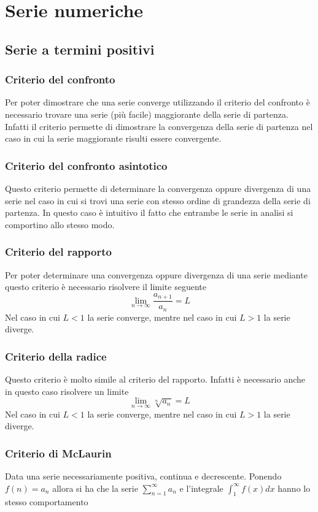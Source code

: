 \documentclass[10pt,a4paper]{report}
\begin{document}
\section*{Serie numeriche}
\subsection*{Serie a termini positivi}

\subsubsection{Criterio del confronto}
 Per poter dimostrare che una serie converge utilizzando il criterio del confronto è necessario trovare una serie (più facile) maggiorante della serie di partenza. Infatti il criterio permette di dimostrare la convergenza della serie di partenza nel caso in cui la serie maggiorante risulti essere convergente.
\subsubsection{Criterio del confronto asintotico}
Questo criterio permette di determinare la convergenza oppure divergenza di una serie nel caso in cui si trovi una serie con stesso ordine di grandezza della serie di partenza. In questo caso è intuitivo il fatto che entrambe le serie in analisi si comportino allo stesso modo.
\subsubsection{Criterio del rapporto}
Per poter determinare una convergenza oppure divergenza di una serie mediante questo criterio è necessario risolvere il limite seguente \[ \lim_{n \to \infty} \frac{a_{n+1}}{a_{n}} =L \] Nel caso in cui $ L < 1 $ la serie converge, mentre nel caso in cui $ L > 1 $ la serie diverge.
\subsubsection{Criterio della radice}
Questo criterio è molto simile al criterio del rapporto. Infatti è necessario anche in questo caso risolvere un limite \[ \lim_{n \to \infty} \sqrt[n]{a_{n}} = L \] Nel caso in cui $ L < 1 $ la serie converge, mentre nel caso in cui $ L > 1 $ la serie diverge.
\subsubsection{Criterio di McLaurin}
Data una serie necessariamente positiva, continua e decrescente. Ponendo $ f(n) = a_{n} $ allora si ha che la serie $ \sum_{n=1}^{\infty} a_{n} $ e l'integrale $ \int_{1}^{\infty} f(x)dx $ hanno lo stesso comportamento 
                
\end{document}
